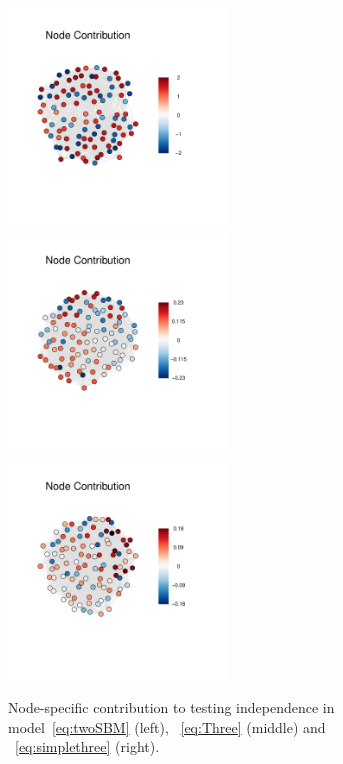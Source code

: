 \documentclass[12pt]{article}
\theoremstyle{definition}
\begin{document}
\begin{figure}[H]
	\centering
	\includegraphics[width=2.3in]{../Figure/twoSBM_weight.pdf}
	\includegraphics[width=2.3in]{../Figure/ThreeSBM_weight.pdf}
	\includegraphics[width=2.3in]{../Figure/simplethree_weight.pdf}
	\caption{Node-specific contribution to testing independence in model~\ref{eq:twoSBM} (left), ~\ref{eq:Three} (middle) and ~\ref{eq:simplethree} (right).}
	\label{fig:weight1}
\end{figure}
\end{document}
